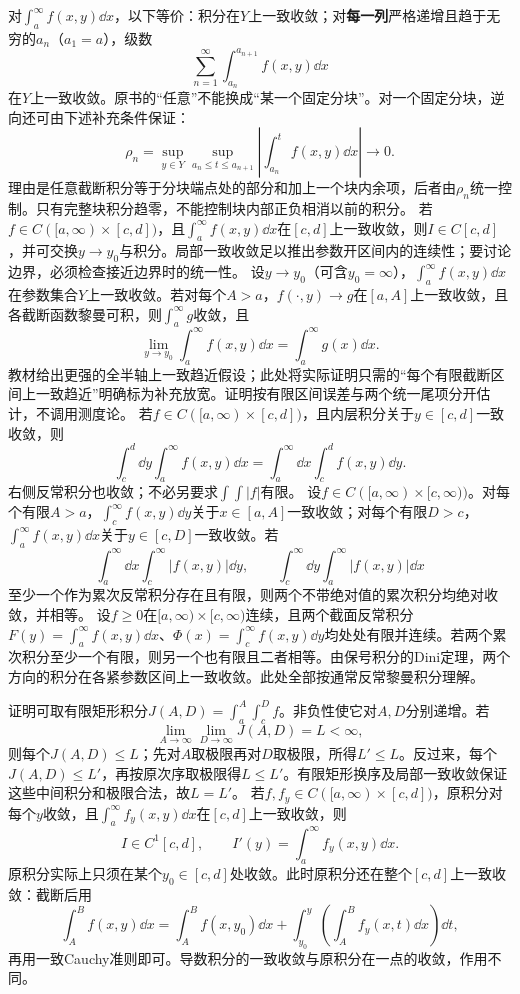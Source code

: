 对$\int_a^\infty f(x,y)\dd x$，以下等价：积分在$Y$上一致收敛；对\textbf{每一列}严格递增且趋于无穷的$a_n$（$a_1=a$），级数
\[
 \sum_{n=1}^\infty\int_{a_n}^{a_{n+1}}f(x,y)\dd x
\]
在$Y$上一致收敛。原书的“任意”不能换成“某一个固定分块”。对一个固定分块，逆向还可由下述补充条件保证：
\[
 \rho_n=\sup_{y\in Y}\sup_{a_n\le t\le a_{n+1}}
 \left|\int_{a_n}^t f(x,y)\dd x\right|\longrightarrow0.
\]
理由是任意截断积分等于分块端点处的部分和加上一个块内余项，后者由$\rho_n$统一控制。只有完整块积分趋零，不能控制块内部正负相消以前的积分。
若$f\in C([a,\infty)\times[c,d])$，且$\int_a^\infty f(x,y)\dd x$在$[c,d]$上一致收敛，则$I\in C[c,d]$，并可交换$y\to y_0$与积分。局部一致收敛足以推出参数开区间内的连续性；要讨论边界，必须检查接近边界时的统一性。
设$y\to y_0$（可含$y_0=\infty$），$\int_a^\infty f(x,y)\dd x$在参数集合$Y$上一致收敛。若对每个$A>a$，$f(\cdot,y)\to g$在$[a,A]$上一致收敛，且各截断函数黎曼可积，则$\int_a^\infty g$收敛，且
\[
 \lim_{y\to y_0}\int_a^\infty f(x,y)\dd x=\int_a^\infty g(x)\dd x.
\]
教材给出更强的全半轴上一致趋近假设；此处将实际证明只需的“每个有限截断区间上一致趋近”明确标为补充放宽。证明按有限区间误差与两个统一尾项分开估计，不调用测度论。
若$f\in C([a,\infty)\times[c,d])$，且内层积分关于$y\in[c,d]$一致收敛，则
\[
 \int_c^d\dd y\int_a^\infty f(x,y)\dd x
 =\int_a^\infty\dd x\int_c^d f(x,y)\dd y.
\]
右侧反常积分也收敛；不必另要求$\int\!\int|f|$有限。
设$f\in C([a,\infty)\times[c,\infty))$。对每个有限$A>a$，$\int_c^\infty f(x,y)\dd y$关于$x\in[a,A]$一致收敛；对每个有限$D>c$，$\int_a^\infty f(x,y)\dd x$关于$y\in[c,D]$一致收敛。若
\[
 \int_a^\infty\dd x\int_c^\infty|f(x,y)|\dd y,
 \qquad
 \int_c^\infty\dd y\int_a^\infty|f(x,y)|\dd x
\]
至少一个作为累次反常积分存在且有限，则两个不带绝对值的累次积分均绝对收敛，并相等。
设$f\ge0$在$[a,\infty)\times[c,\infty)$连续，且两个截面反常积分$F(y)=\int_a^\infty f(x,y)\dd x$、$\Phi(x)=\int_c^\infty f(x,y)\dd y$均处处有限并连续。若两个累次积分至少一个有限，则另一个也有限且二者相等。由保号积分的Dini定理，两个方向的积分在各紧参数区间上一致收敛。此处全部按通常反常黎曼积分理解。

证明可取有限矩形积分$J(A,D)=\int_a^A\int_c^D f$。非负性使它对$A,D$分别递增。若
\[
 \lim_{A\to\infty}\lim_{D\to\infty}J(A,D)=L<\infty,
\]
则每个$J(A,D)\le L$；先对$A$取极限再对$D$取极限，所得$L'\le L$。反过来，每个$J(A,D)\le L'$，再按原次序取极限得$L\le L'$。有限矩形换序及局部一致收敛保证这些中间积分和极限合法，故$L=L'$。
若$f,f_y\in C([a,\infty)\times[c,d])$，原积分对每个$y$收敛，且$\int_a^\infty f_y(x,y)\dd x$在$[c,d]$上一致收敛，则
\[
 I\in C^1[c,d],\qquad I'(y)=\int_a^\infty f_y(x,y)\dd x.
\]
原积分实际上只须在某个$y_0\in[c,d]$处收敛。此时原积分还在整个$[c,d]$上一致收敛：截断后用
\[
 \int_A^B f(x,y)\dd x=\int_A^B f(x,y_0)\dd x
 +\int_{y_0}^y\left(\int_A^B f_y(x,t)\dd x\right)\dd t,
\]
再用一致Cauchy准则即可。导数积分的一致收敛与原积分在一点的收敛，作用不同。
